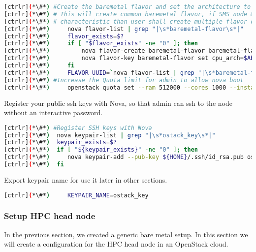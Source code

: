 
\begin{lstlisting}[language=bash,keywords={}]
[ctrlr](*\#*) #Create the baremetal flavor and set the architecture to x86_64
[ctrlr](*\#*) # This will create common baremetal flavor, if SMS node & compute has different
[ctrlr](*\#*) # characteristic than user shall create multiple flavor one for each characterisitc
[ctrlr](*\#*)     nova flavor-list | grep "|\s*baremetal-flavor\s*|"
[ctrlr](*\#*)     flavor_exists=$?
[ctrlr](*\#*)     if [ "$flavor_exists" -ne "0" ]; then
[ctrlr](*\#*)         nova flavor-create baremetal-flavor baremetal-flavor ${RAM_MB} ${DISK_GB} ${CPU}
[ctrlr](*\#*)         nova flavor-key baremetal-flavor set cpu_arch=$ARCH
[ctrlr](*\#*)     fi
[ctrlr](*\#*)     FLAVOR_UUID=`nova flavor-list | grep "|\s*baremetal-flavor\s*|" | awk '{print $2}'`
[ctrlr](*\#*) #Increase the Quota limit for admin to allow nova boot
[ctrlr](*\#*)     openstack quota set --ram 512000 --cores 1000 --instances 100 admin
\end{lstlisting} 

	Register your public ssh keys with Nova, so that admin can ssh to the node without an interactive password.


\begin{lstlisting}[language=bash,keywords={}]
[ctrlr](*\#*) #Register SSH keys with Nova
[ctrlr](*\#*)  nova keypair-list | grep "|\s*ostack_key\s*|"
[ctrlr](*\#*)  keypair_exists=$?
[ctrlr](*\#*)  if [ "${keypair_exists}" -ne "0" ]; then
[ctrlr](*\#*)     nova keypair-add --pub-key ${HOME}/.ssh/id_rsa.pub ostack_key
[ctrlr](*\#*)  fi
\end{lstlisting} 

	Export keypair name for use it later in other sections.


\begin{lstlisting}[language=bash,keywords={}]
[ctrlr](*\#*)     KEYPAIR_NAME=ostack_key
\end{lstlisting} 
\newpage
\subsubsection{Setup HPC head node}


	In the previous section, we created a generic bare metal setup. In this section we will create a configuration for the HPC head node in an OpenStack cloud.
	
